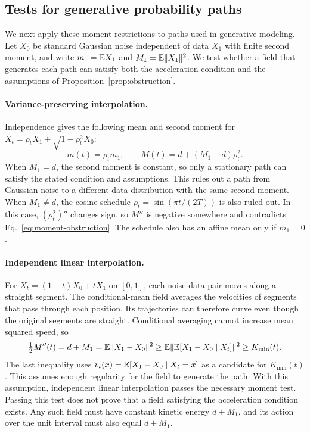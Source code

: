 \subsection{Tests for generative probability paths}

We next apply these moment restrictions to paths used in generative modeling. Let $X_0$ be standard Gaussian noise independent of data $X_1$ with finite second moment, and write $m_1=\mathbb E X_1$ and $M_1=\mathbb E\|X_1\|^2$. We test whether a field that generates each path can satisfy both the acceleration condition and the assumptions of Proposition~\ref{prop:obstruction}.

\paragraph{Variance-preserving interpolation.}
Independence gives the following mean and second moment for $X_t=\rho_tX_1+\sqrt{1-\rho_t^2}X_0$:
\[
 m(t)=\rho_tm_1,\qquad M(t)=d+(M_1-d)\rho_t^2.
\]
When $M_1=d$, the second moment is constant, so only a stationary path can satisfy the stated condition and assumptions. This rules out a path from Gaussian noise to a different data distribution with the same second moment. When $M_1\ne d$, the cosine schedule $\rho_t=\sin(\pi t/(2T))$ is also ruled out. In this case, $(\rho_t^2)''$ changes sign, so $M''$ is negative somewhere and contradicts Eq.~\eqref{eq:moment-obstruction}. The schedule also has an affine mean only if $m_1=0$.

\paragraph{Independent linear interpolation.}
For $X_t=(1-t)X_0+tX_1$ on $[0,1]$, each noise-data pair moves along a straight segment. The conditional-mean field averages the velocities of segments that pass through each position. Its trajectories can therefore curve even though the original segments are straight. Conditional averaging cannot increase mean squared speed, so
\[
 \tfrac12M''(t)=d+M_1
 =\mathbb E\|X_1-X_0\|^2
 \ge\mathbb E\|\mathbb E[X_1-X_0\mid X_t]\|^2\ge K_{\min}(t).
\]
The last inequality uses $v_t(x)=\mathbb E[X_1-X_0\mid X_t=x]$ as a candidate for $K_{\min}(t)$. This assumes enough regularity for the field to generate the path. With this assumption, independent linear interpolation passes the necessary moment test. Passing this test does not prove that a field satisfying the acceleration condition exists. Any such field must have constant kinetic energy $d+M_1$, and its action over the unit interval must also equal $d+M_1$.

